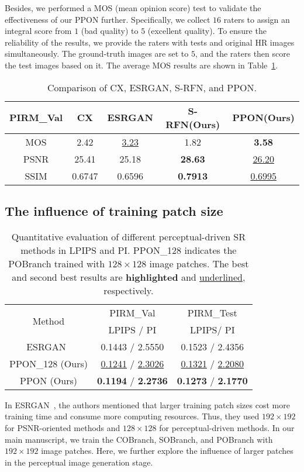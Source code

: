 \documentclass[preprint]{elsarticle}
\begin{document}
Besides, we performed a MOS (mean opinion score) test to validate the effectiveness of our PPON further. Specifically, we collect $16$ raters to assign an integral score from $1$ (bad quality) to $5$ (excellent quality). To ensure the reliability of the results, we provide the raters with tests and original HR images simultaneously. The ground-truth images are set to $5$, and the raters then score the test images based on it. The average MOS results are shown in Table~\ref{tab:MOS}. 
\begin{table}[htpb]
	\centering
	\caption{Comparison of CX, ESRGAN, S-RFN, and PPON.}
	\label{tab:MOS}
	\begin{tabular}{|c|c|c|c|c|}
		\hline
		PIRM\_Val & CX & ESRGAN & S-RFN(Ours) & PPON(Ours) \\
		\hline
		MOS & 2.42 & \underline{3.23} & 1.82 & \textbf{3.58} \\
		PSNR & 25.41 & 25.18 & \textbf{28.63} & \underline{26.20} \\
		SSIM & 0.6747 & 0.6596 & \textbf{0.7913} & \underline{0.6995} \\
		\hline
	\end{tabular}
\end{table}

\subsection{The influence of training patch size}
\begin{table}[htpb]
	\caption{Quantitative evaluation of different perceptual-driven SR methods in LPIPS and PI. PPON\_128 indicates the POBranch trained with $128 \times 128$ image patches. The best and second best results are \textbf{highlighted} and \underline{underlined}, respectively.}
	\label{tab:ppon-128-192}
	\begin{center}
		\begin{tabular}{|c|c|c|}
			\hline
			\multirow{2}{*}{Method} & PIRM\_Val & PIRM\_Test \\
			\cline{2-3}
			& LPIPS / PI & LPIPS/ PI \\
			\hline
			\hline
			ESRGAN~\cite{ESRGAN} & 0.1443 / 2.5550 & 0.1523 / 2.4356 \\
			PPON\_128 (Ours) & \underline{ 0.1241} / \underline{2.3026} & \underline{0.1321} / \underline{2.2080} \\
			PPON (Ours) & \textbf{0.1194} / \textbf{2.2736} & \textbf{0.1273} / \textbf{2.1770} \\
			\hline
		\end{tabular}
	\end{center}
\end{table}
In ESRGAN~\cite{ESRGAN}, the authors mentioned that larger training patch sizes cost more training time and consume more computing resources. Thus, they used $192 \times 192$ for PSNR-oriented methods and $128 \times 128$ for perceptual-driven methods. In our main manuscript, we train the COBranch, SOBranch, and POBranch with $192 \times 192$ image patches. Here, we further explore the influence of larger patches in the perceptual image generation stage.
\end{document}
